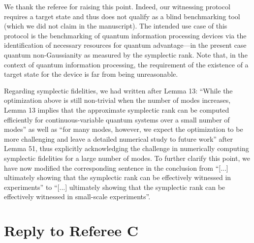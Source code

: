 \documentclass[a4paper,12pt]{article}
\newenvironment{Comment}[0]
{\noindent {\bf General Comment:} \begin{quote}}
{\end{quote}\vspace{0 cm}}
\newenvironment{Response}
{\noindent \color{RawSienna}{\bf Response:} }
{\vspace{0.4 cm}}
\begin{document}
\begin{Response}
    We thank the referee for raising this point. Indeed, our witnessing protocol requires a target state and thus does not qualify as a blind benchmarking tool (which we did not claim in the manuscript). The intended use case of this protocol is the benchmarking of quantum information processing devices via the identification of necessary resources for quantum advantage---in the present case quantum non-Gaussianity as measured by the symplectic rank. Note that, in the context of quantum information processing, the requirement of the existence of a target state for the device is far from being unreasonable.
    
    Regarding symplectic fidelities, we had written after Lemma 13: ``While the optimization above is still non-trivial when the number of modes increases, Lemma 13 implies that the approximate symplectic rank can be computed efficiently for continuous-variable quantum systems over a small number of modes'' as well as ``for many modes, however, we expect the optimization to be more challenging and leave a detailed numerical study to future work'' after Lemma 51, thus explicitly acknowledging the challenge in numerically computing symplectic fidelities for a large number of modes. To further clarify this point, we have now modified the corresponding sentence in the conclusion from ``[...] ultimately showing that the symplectic rank can be effectively witnessed in experiments'' to ``[...] ultimately showing that the symplectic rank can be effectively witnessed in small-scale experiments''.
\end{Response}

\section{Reply to Referee C}

\end{document}
